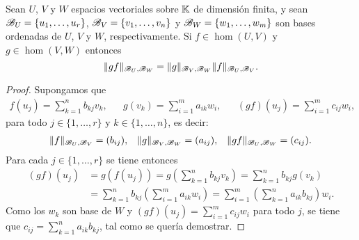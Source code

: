 \begin{thm}
    \label{thm:|gf|=|g||f|}
    Sean $U$, $V$ y $W$ espacios vectoriales sobre $\mathbb{K}$ de dimensión finita, y
    sean $\mathscr{B}_U=\{u_1,\dots,u_r\}$, $\mathscr{B}_V=\{v_1,\dots,v_n\}$ y
    $\mathscr{B}_W=\{w_1,\dots,w_m\}$ son bases ordenadas de $U$, $V$ y $W$,
    respectivamente.  Si $f\in\hom(U,V)$ y $g\in\hom(V,W)$ entonces
    \[
        \|gf\|_{\mathscr{B}_U,\mathscr{B}_W}=\|g\|_{\mathscr{B}_V,\mathscr{B}_W}\|f\|_{\mathscr{B}_U,\mathscr{B}_V}.
    \]

    \begin{proof}
        Supongamos que 
        \begin{align*}
        f(u_j)=\sum_{k=1}^n b_{kj}v_k,&&
        g(v_k)=\sum_{i=1}^ma_{ik}w_i,&&
        (gf)(u_j)=\sum_{i=1}^m c_{ij}w_i,
        \end{align*}
        para todo $j\in\{1,\dots,r\}$ y $k\in\{1,\dots,n\}$, es decir: 
        \begin{align*}
            \|f\|_{\mathscr{B}_U,\mathscr{B}_V}=(b_{ij}),
            && 
            \|g\|_{\mathscr{B}_V,\mathscr{B}_W}=(a_{ij}),
            &&
            \|gf\|_{\mathscr{B}_U,\mathscr{B}_W}=(c_{ij}).
        \end{align*}
        Para cada $j\in\{1,\dots,r\}$ se tiene entonces
        \begin{align*}
            (gf)(u_j)&=g(f(u_j))=g\left(\sum_{k=1}^n b_{kj}v_k\right)=\sum_{k=1}^n b_{kj}g(v_k)\\
            &=\sum_{k=1}^n b_{kj}\left(\sum_{i=1}^ma_{ik}w_i\right)
            =\sum_{i=1}^m\left(\sum_{k=1}^na_{ik}b_{kj}\right)w_i.
        \end{align*}
        Como los $w_k$ son base de $W$ y $(gf)(u_j)=\sum_{i=1}^mc_{ij}w_i$ para todo $j$, se tiene
        que $c_{ij}=\sum_{k=1}^na_{ik}b_{kj}$, tal como se quería demostrar.
    \end{proof}
\end{thm}


